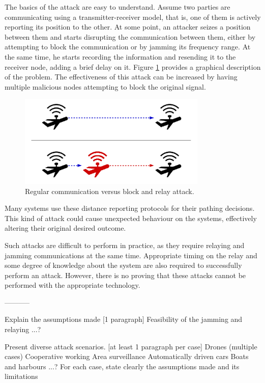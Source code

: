 \documentclass{article}
\begin{document}
The basics of the attack are easy to understand. Assume two parties are communicating using a transmitter-receiver model, that is, one of them is actively reporting its position to the other. At some point, an attacker seizes a position between them and starts disrupting the communication between them, either by attempting to block the communication or by jamming its frequency range. At the same time, he starts recording the information and resending it to the receiver node, adding a brief delay on it. Figure \ref{fig:attackexample1} provides a graphical description of the problem. The effectiveness of this attack can be increased by having multiple malicious nodes attempting to block the original signal.

\begin{figure}[h!]
  \centering
    \includegraphics[width=0.8\textwidth]{images/attack1.png}
  \caption{Regular communication versus block and relay attack.}
  \label{fig:attackexample1}
\end{figure}

Many systems use these distance reporting protocols for their pathing decisions. This kind of attack could cause unexpected behaviour on the systems, effectively altering their original desired outcome. 

Such attacks are difficult to perform in practice, as they require relaying and jamming communications at the same time. Appropriate timing on the relay and some degree of knowledge about the system are also required to successfully perform an attack. However, there is no proving that these attacks cannot be performed with the appropriate technology.


-----------


Explain the assumptions made [1 paragraph]
   Feasibility of the jamming and relaying
   ...?
   
Present diverse attack scenarios. [at least 1 paragraph per case]
   Drones (multiple cases)
     Cooperative working
     Area surveillance
   Automatically driven cars
   Boats and harbours
  ...?
For each case, state clearly the assumptions made and its limitations
\end{document}
